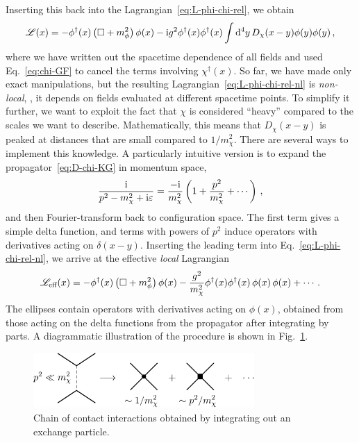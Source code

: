 %
Inserting this back into the Lagrangian~\eqref{eq:L-phi-chi-rel}, we obtain 
%
\begin{equation}
 \LL(x) = {-}\phi^\dagger(x)\left(\dAlem + m_\phi^2\right)\phi(x)
 - \ii g^2 \phi^\dagger(x) \phi^\dagger(x)
 \int\dd^4y \, D_\chi(x-y) \phi(y) \phi(y) \,,
\label{eq:L-phi-chi-rel-nl}
\end{equation}
%
where we have written out the spacetime dependence of all fields and used 
Eq.~\eqref{eq:chi-GF} to cancel the terms involving $\chi^\dagger(x)$.  So far, 
we have made only exact manipulations, but the resulting 
Lagrangian~\eqref{eq:L-phi-chi-rel-nl} is \emph{non-local}, \ie, it depends on 
fields evaluated at different spacetime points.  To simplify it further, we 
want to exploit the fact that $\chi$ is considered ``heavy'' compared to the 
scales we want to describe.  Mathematically, this means that $D_\chi(x-y)$ is 
peaked at distances that are small compared to $1/m_\chi^2$.  There are several 
ways to implement this knowledge.  A particularly intuitive version is to expand 
the propagator~\eqref{eq:D-chi-KG} in momentum space,
%
\begin{equation}
 \frac{\ii}{p^2-m_\chi^2 + \ii\eps}
 = \frac{{-}\ii}{m_\chi^2}\left(1 + \frac{p^2}{m_\chi^2} + \cdots\right) \,,
\label{eq:D-chi-expansion}
\end{equation}
%
and then Fourier-transform back to configuration space.  The first term gives a 
simple delta function, and terms with powers of $p^2$ induce operators with 
derivatives acting on $\delta(x-y)$.  Inserting the leading term into 
Eq.~\eqref{eq:L-phi-chi-rel-nl}, we arrive at the effective \emph{local} 
Lagrangian
%
\begin{equation}
 \LL_{\text{eff}}(x) = {-}\phi^\dagger(x)\left(\dAlem + m_\phi^2\right)\phi(x)
 - \frac{g^2}{m_\chi^2} \phi^\dagger(x) \phi^\dagger(x) \, \phi(x) \, \phi(x)
 + \cdots \,.
\label{eq:L-phi-chi-rel-eff}
\end{equation}
%
The ellipses contain operators with derivatives acting on $\phi(x)$, obtained 
from those acting on the delta functions from the propagator after integrating 
by parts.  A diagrammatic illustration of the procedure is shown in
Fig.~\ref{fig:BosonContact-2body}.

\begin{figure}[htbp]
\centering
\includegraphics[clip,width=0.75\textwidth]{BosonContact-2body}
\caption{Chain of contact interactions obtained by integrating out an exchange 
particle.}
\label{fig:BosonContact-2body}
\end{figure}

